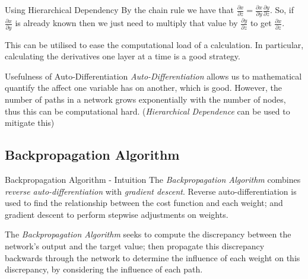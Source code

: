 \documentclass[11pt,a4paper]{article}
\begin{document}
  \begin{proposition}{Using Hierarchical Dependency}
    By the chain rule we have that $\frac{\partial x}{\partial z}=\frac{\partial x}{\partial y}\frac{\partial y}{\partial z}$. So, if $\frac{\partial x}{\partial y}$ is already known then we just need to multiply that value by $\frac{\partial y}{\partial z}$ to get $\frac{\partial x}{\partial z}$.
    \par This can be utilised to ease the computational load of a calculation. In particular, calculating the derivatives one layer at a time is a good strategy.
  \end{proposition}

  \begin{remark}{Usefulness of Auto-Differentiation}
    \textit{Auto-Differentiation} allows us to mathematical quantify the affect one variable has on another, which is good. However, the number of paths in a network grows exponentially with the number of nodes, thus this can be computational hard. (\textit{Hierarchical Dependence} can be used to mitigate this)
  \end{remark}

\subsection{Backpropagation Algorithm}

  \begin{remark}{Backpropagation Algorithm - Intuition}
    The \textit{Backpropagation Algorithm} combines \textit{reverse auto-differentiation} with \textit{gradient descent}. Reverse auto-differentiation is used to find the relationship between the cost function and each weight; and gradient descent to perform stepwise adjustments on weights.
    \par The \textit{Backpropagation Algorithm} seeks to compute the discrepancy between the network's output and the target value; then propagate this discrepancy backwards through the network to determine the influence of each weight on this discrepancy, by considering the influence of each path.
  \end{remark}
\end{document}
